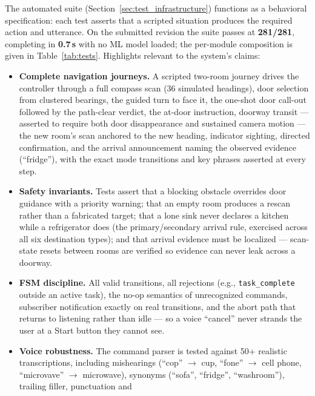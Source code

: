 The automated suite (Section~\ref{sec:test_infrastructure}) functions as a
behavioral specification: each test asserts that a scripted situation produces the
required action and utterance. On the submitted revision the suite passes at
\textbf{281/281}, completing in \textbf{0.7\,s} with no ML model loaded; the
per-module composition is given in Table~\ref{tab:tests}. Highlights relevant to
the system's claims:

\begin{itemize}[nosep]
  \item \textbf{Complete navigation journeys.} A scripted two-room journey drives
        the controller through a full compass scan (36 simulated headings), door
        selection from clustered bearings, the guided turn to face it, the
        one-shot door call-out followed by the path-clear verdict, the at-door
        instruction, doorway transit --- asserted to require both door
        disappearance and sustained camera motion --- the new room's scan
        anchored to the new heading, indicator sighting, directed confirmation,
        and the arrival announcement naming the observed evidence (``fridge''),
        with the exact mode transitions and key phrases asserted at every step.
  \item \textbf{Safety invariants.} Tests assert that a blocking obstacle
        overrides door guidance with a priority warning; that an empty room
        produces a rescan rather than a fabricated target; that a lone sink never
        declares a kitchen while a refrigerator does (the primary/secondary
        arrival rule, exercised across all six destination types); and that
        arrival evidence must be localized --- scan-state resets between rooms
        are verified so evidence can never leak across a doorway.
  \item \textbf{FSM discipline.} All valid transitions, all rejections (e.g.,
        \texttt{task\_complete} outside an active task), the no-op semantics of
        unrecognized commands, subscriber notification exactly on real
        transitions, and the abort path that returns to listening rather than
        idle --- so a voice ``cancel'' never strands the user at a Start button
        they cannot see.
  \item \textbf{Voice robustness.} The command parser is tested against 50+
        realistic transcriptions, including mishearings (``cop'' $\to$ cup,
        ``fone'' $\to$ cell phone, ``microvave'' $\to$ microwave), synonyms
        (``sofa'', ``fridge'', ``washroom''), trailing filler, punctuation and

\end{itemize}
